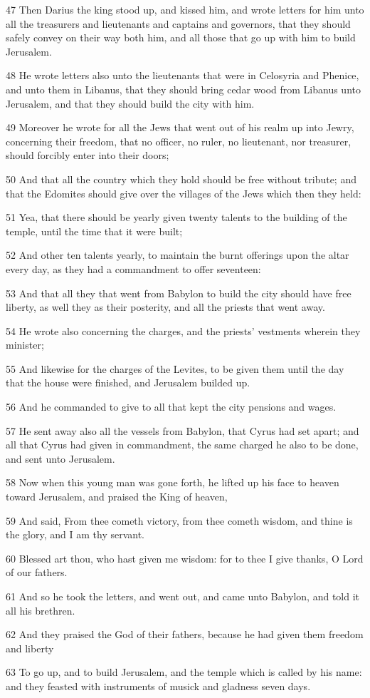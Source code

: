 \par 47 Then Darius the king stood up, and kissed him, and wrote letters for him unto all the treasurers and lieutenants and captains and governors, that they should safely convey on their way both him, and all those that go up with him to build Jerusalem.
\par 48 He wrote letters also unto the lieutenants that were in Celosyria and Phenice, and unto them in Libanus, that they should bring cedar wood from Libanus unto Jerusalem, and that they should build the city with him.
\par 49 Moreover he wrote for all the Jews that went out of his realm up into Jewry, concerning their freedom, that no officer, no ruler, no lieutenant, nor treasurer, should forcibly enter into their doors;
\par 50 And that all the country which they hold should be free without tribute; and that the Edomites should give over the villages of the Jews which then they held:
\par 51 Yea, that there should be yearly given twenty talents to the building of the temple, until the time that it were built;
\par 52 And other ten talents yearly, to maintain the burnt offerings upon the altar every day, as they had a commandment to offer seventeen:
\par 53 And that all they that went from Babylon to build the city should have free liberty, as well they as their posterity, and all the priests that went away.
\par 54 He wrote also concerning the charges, and the priests' vestments wherein they minister;
\par 55 And likewise for the charges of the Levites, to be given them until the day that the house were finished, and Jerusalem builded up.
\par 56 And he commanded to give to all that kept the city pensions and wages.
\par 57 He sent away also all the vessels from Babylon, that Cyrus had set apart; and all that Cyrus had given in commandment, the same charged he also to be done, and sent unto Jerusalem.
\par 58 Now when this young man was gone forth, he lifted up his face to heaven toward Jerusalem, and praised the King of heaven,
\par 59 And said, From thee cometh victory, from thee cometh wisdom, and thine is the glory, and I am thy servant.
\par 60 Blessed art thou, who hast given me wisdom: for to thee I give thanks, O Lord of our fathers.
\par 61 And so he took the letters, and went out, and came unto Babylon, and told it all his brethren.
\par 62 And they praised the God of their fathers, because he had given them freedom and liberty
\par 63 To go up, and to build Jerusalem, and the temple which is called by his name: and they feasted with instruments of musick and gladness seven days.

